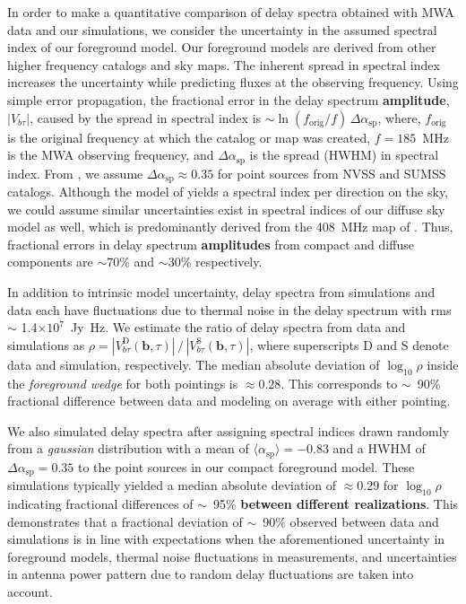 \documentclass[preprint2,iop,numberedappendix,twocolappendix,appendixfloats]{emulateapj}
\begin{document}
In order to make a quantitative comparison of delay spectra obtained with MWA data and our simulations, we consider the uncertainty in the assumed spectral index of our foreground model. Our foreground models are derived from other higher frequency catalogs and sky maps. The inherent spread in spectral index increases the uncertainty while predicting fluxes at the observing frequency. Using simple error propagation, the fractional error in the delay spectrum {\bf amplitude}, $|V_{b\tau}|$, caused by the spread in spectral index is $\sim \ln(f_\textrm{orig}/f)\,\Delta\alpha_\textrm{sp}$, where, $f_\textrm{orig}$ is the original frequency at which the catalog or map was created, $f=185$~MHz is the MWA observing frequency, and $\Delta\alpha_\textrm{sp}$ is the spread (HWHM) in spectral index. From \citet{mau03}, we assume $\Delta\alpha_\textrm{sp} \approx 0.35$ for point sources from NVSS and SUMSS catalogs. Although the model of \citet{deo08} yields a spectral index per direction on the sky, we could assume similar uncertainties exist in spectral indices of our diffuse sky model as well, which is predominantly derived from the 408~MHz map of \citet{has82}. Thus, fractional errors in delay spectrum {\bf amplitudes} from compact and diffuse components are $\sim$70\% and $\sim$30\% respectively. 

In addition to intrinsic model uncertainty, delay spectra from simulations and data each have fluctuations due to thermal noise in the delay spectrum with rms $\sim$ 1.4$\times 10^7$~Jy~Hz. We estimate the ratio of delay spectra from data and simulations as $\rho = |V^\textrm{D}_{b\tau}(\boldsymbol{b},\tau)|\,/\,|V^\textrm{S}_{b\tau}(\boldsymbol{b},\tau)|$, where superscripts D and S denote data and simulation, respectively. The median absolute deviation of $\log_{10}\rho$ inside the {\it foreground wedge} for both pointings is $\approx 0.28$. This corresponds to $\sim$~90\% fractional difference between data and modeling on average with either pointing. 

We also simulated delay spectra after assigning spectral indices drawn randomly from a {\it gaussian} distribution with a mean of $\langle\alpha_\textrm{sp}\rangle=-0.83$ and a HWHM of $\Delta\alpha_\textrm{sp}=0.35$ to the point sources in our compact foreground model. These simulations typically yielded a median absolute deviation of $\approx 0.29$ for $\log_{10}\rho$ indicating fractional differences of $\sim$~95\% {\bf between different realizations}. This demonstrates that a fractional deviation of $\sim$~90\% observed between data and simulations is in line with expectations when the aforementioned uncertainty in foreground models, thermal noise fluctuations in measurements, and uncertainties in antenna power pattern due to random delay fluctuations are taken into account. 
\end{document}
